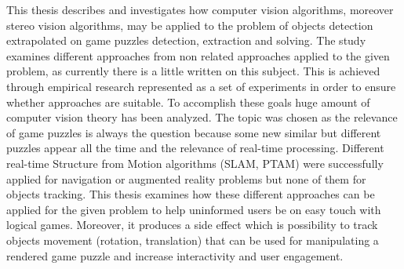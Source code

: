 \documentclass[../main]{subfiles}
\begin{document}
This thesis describes and investigates how computer vision algorithms, moreover stereo vision algorithms, may be applied to the problem of objects detection extrapolated on game puzzles detection, extraction and solving. The study examines different approaches from non related approaches applied to the given problem, as currently there is a little written on this subject. This is achieved through empirical research represented as a set of experiments in order to ensure whether approaches are suitable. To accomplish these goals huge amount of computer vision theory has been analyzed. The topic was chosen as the relevance of game puzzles is always the question because some new similar but different puzzles appear all the time and the relevance of real-time processing. Different real-time Structure from Motion algorithms (SLAM, PTAM) were successfully applied for navigation or augmented reality problems but none of them for objects tracking. This thesis examines how these different approaches can be applied for the given problem to help uninformed users be on easy touch with logical games. Moreover, it produces a side effect which is possibility to track objects movement (rotation, translation) that can be used for manipulating a rendered game puzzle and increase interactivity and user engagement.
\end{document}
